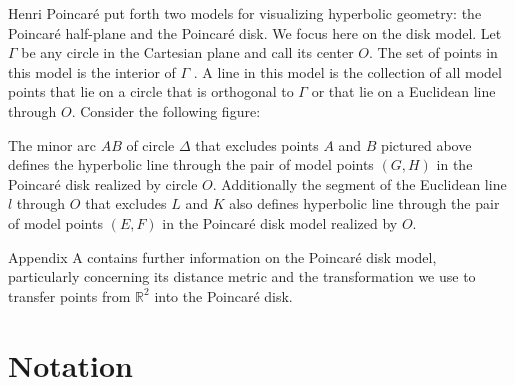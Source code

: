 \documentclass[12pt]{article}
\newcommand{\R}{\mathbb{R}}
\newcommand{\poincare}{Poincar\'{e} }
\theoremstyle{plain}
\theoremstyle{definition}
\begin{document}
Henri \poincare put forth two models for visualizing hyperbolic geometry: the \poincare half-plane and the \poincare disk. We focus here on the disk model. Let $\Gamma$ be any circle in the Cartesian plane and call its center $O$. The set of points in this model is the interior of $\Gamma$ \cite{hartshorne}. A line in this model is the collection of all model points that lie on a circle that is orthogonal to $\Gamma$ or that lie on a Euclidean line through $O$. Consider the following figure: 

\begin{center}
\end{center}

The minor arc $AB$ of circle $\Delta$ that excludes points $A$ and $B$ pictured above defines the hyperbolic line through the pair of model points $(G,H)$ in the \poincare disk realized by circle $O$. Additionally the segment of the Euclidean line $l$ through $O$ that excludes $L$ and $K$ also defines hyperbolic line through the pair of model points $(E,F)$ in the \poincare disk model realized by $O$.

Appendix A contains further information on the \poincare disk model, particularly concerning its distance metric and the transformation we use to transfer points from $\R^2$ into the \poincare disk.

\section{Notation}
	
\end{document}
